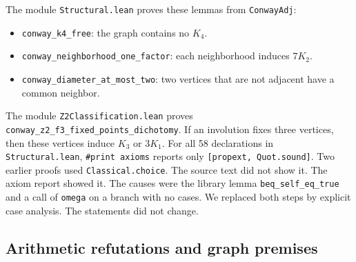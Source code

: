 \documentclass[pdflatex,sn-mathphys-num]{sn-jnl}
\theoremstyle{thmstyleone}
\theoremstyle{thmstyletwo}
\theoremstyle{thmstylethree}
\numberwithin{equation}{section}
\begin{document}
The module \texttt{Structural.lean} proves these lemmas from \texttt{ConwayAdj}:
\begin{itemize}
 \item \texttt{conway\_k4\_free}: the graph contains no $K_4$.
 \item \texttt{conway\_neighborhood\_one\_factor}: each neighborhood induces $7K_2$.
 \item \texttt{conway\_diameter\_at\_most\_two}: two vertices that are not adjacent have a common neighbor.
\end{itemize}
The module \texttt{Z2Classification.lean} proves \texttt{conway\_z2\_f3\_fixed\_points\_dichotomy}. If an involution fixes three vertices, then these vertices induce $K_3$ or $3K_1$.
For all 58 declarations in \texttt{Structural.lean}, \texttt{\#print axioms} reports only \texttt{[propext, Quot.sound]}.
Two earlier proofs used \texttt{Classical.choice}. The source text did not show it. The axiom report showed it.
The causes were the library lemma \texttt{beq\_self\_eq\_true} and a call of \texttt{omega} on a branch with no cases. We replaced both steps by explicit case analysis. The statements did not change.

\subsection{Arithmetic refutations and graph premises}
\end{document}
